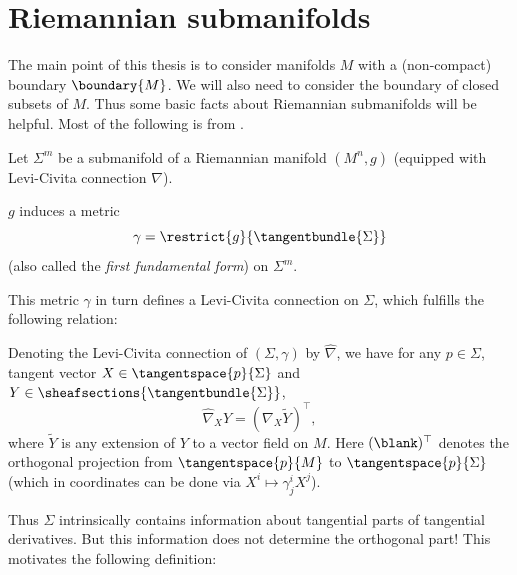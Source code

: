 \documentclass[titlepage,numbers=noenddot,oneside,%
cleardoublepage=empty,paper=a4,fontsize=11pt,%
english,%
]{scrartcl}
\begin{document}
\section{Riemannian submanifolds}\label{sec:riemannian_submanifolds}

The main point of this thesis is to consider manifolds \( M \) with a (non-compact) boundary \( \boundary{M} \). We will also need to consider the boundary of closed subsets of \( M \). Thus some basic facts about Riemannian submanifolds will be helpful. Most of the following is from \cite[Chapter~2.1]{leeGeometricRelativity2019}.

{ \newcommand{\Mconnection}{\nabla}\newcommand{\Sigmaconnection}{\hat{\nabla}}
Let \( \Sigma^m \) be a submanifold of a Riemannian manifold \( (M^n,g) \) (equipped with Levi-Civita connection \( \Mconnection \)).
\begin{remark}
    \( g \) induces a metric
    \begin{equation}
        \gamma=\restrict{g}{\tangentbundle{\Sigma}}\label{eq:first_fundamental_form}
    \end{equation} 
    (also called the \emph{first fundamental form}) on \( \Sigma^m  \). 
\end{remark}
This metric \( \gamma \) in turn defines a Levi-Civita connection on \( \Sigma \), which fulfills the following relation:
\begin{fact}
  Denoting the Levi-Civita connection of \( (\Sigma,\gamma) \) by \( \Sigmaconnection \), we have for any \( p\in \Sigma \), tangent vector \( X\in \tangentspace{p}{\Sigma} \) and \( Y\in \sheafsections{\tangentbundle{\Sigma}} \),
  \begin{equation*}
    \Sigmaconnection_X Y=(\Mconnection_X \tilde{Y})^\top,
  \end{equation*}
  where \( \tilde{Y} \) is any extension of \( Y \) to a vector field on \( M \). Here \( (\blank)^\top \) denotes the orthogonal projection from \( \tangentspace{p}{M} \) to \( \tangentspace{p}{\Sigma} \) (which in coordinates can be done via \( X^i\mapsto \gamma^i_j X^j \)).
\end{fact}
Thus \( \Sigma \) intrinsically contains information about tangential parts of tangential derivatives. But this information does not determine the orthogonal part! This motivates the following definition:
}
\end{document}
